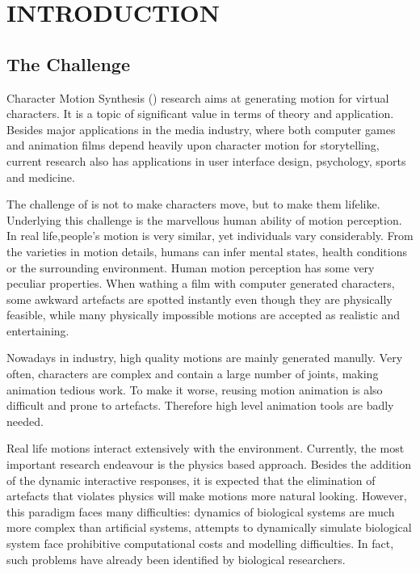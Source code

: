 \chapter{INTRODUCTION}
\label{chap:intro}

\graphicspath{{Introduction/IntroductionFigs/EPS/}{Introduction/IntroductionFigs/}}

\section{The Challenge}
Character Motion Synthesis (\cms) research aims at generating motion for virtual characters.
It is a topic of significant value in terms of theory and application. 
Besides major applications in the media industry, where both computer games and animation films depend heavily upon character motion for storytelling, 
current research also has applications in user interface design, psychology, sports and medicine.

The challenge of \cms  is not to make characters move, but  to make them lifelike. 
Underlying this challenge is the marvellous human ability of motion perception. 
In real life,people's motion is very similar, yet individuals vary considerably.
From the varieties in motion details, humans can infer mental states, health conditions or the surrounding environment.
Human motion perception has some very peculiar properties.
When wathing a film with computer generated characters, some awkward artefacts are spotted instantly even though they are physically feasible, while many physically impossible motions are accepted as realistic and entertaining. 


Nowadays in industry, high quality motions are mainly generated manully. 
Very often, characters are complex and contain a large number of joints, making animation tedious work.
To make it worse, reusing motion animation is also difficult and prone to artefacts.
Therefore high level animation tools are badly needed. 



Real life motions interact extensively with the environment.
Currently, the most important research endeavour is the physics based approach.
Besides  the addition of the dynamic interactive responses, it is  expected that the elimination of  artefacts that violates physics  will make motions more natural looking.
However, this paradigm faces many difficulties:
dynamics of biological systems are much more complex than artificial systems,  attempts to dynamically simulate biological system face prohibitive  computational costs and modelling difficulties.
In fact, such problems have already been identified by biological researchers.







